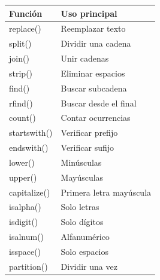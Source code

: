 \begin{center}
\begin{tabular}{|l|l|}
\hline
Función & Uso principal \\ \hline
replace() & Reemplazar texto \\ \hline
split() & Dividir una cadena \\ \hline
join() & Unir cadenas \\ \hline
strip() & Eliminar espacios \\ \hline
find() & Buscar subcadena \\ \hline
rfind() & Buscar desde el final \\ \hline
count() & Contar ocurrencias \\ \hline
startswith() & Verificar prefijo \\ \hline
endswith() & Verificar sufijo \\ \hline
lower() & Minúsculas \\ \hline
upper() & Mayúsculas \\ \hline
capitalize() & Primera letra mayúscula \\ \hline
isalpha() & Solo letras \\ \hline
isdigit() & Solo dígitos \\ \hline
isalnum() & Alfanumérico \\ \hline
isspace() & Solo espacios \\ \hline
partition() & Dividir una vez \\ \hline
\end{tabular}
\end{center}
